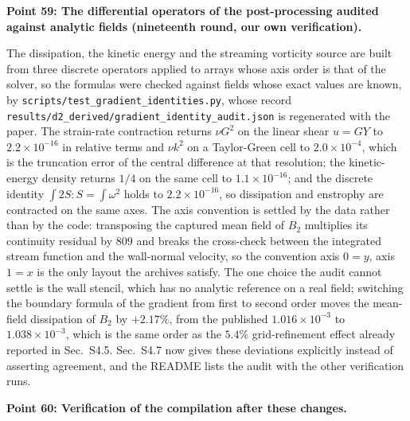 \documentclass[11pt,a4paper]{article}
\newcommand{\brk}{\hspace{0pt}}
\begin{document}
\vspace{1em}

\noindent\textbf{Point 59: The differential operators of the post-processing
audited against analytic fields (nineteenth round, our own verification).}

The dissipation, the kinetic energy and the streaming vorticity source are built
from three discrete operators applied to arrays whose axis order is that of the
solver, so the formulas were checked against fields whose exact values are known,
by \texttt{scripts/test\_gradient\_identities\brk.py}, whose record
\texttt{results/d2\_derived/gradient\_identity\_audit.json} is regenerated with
the paper. The strain-rate contraction returns \(\nu G^2\) on the linear shear
\(u=GY\) to \(2.2\times10^{-16}\) in relative terms and \(\nu k^2\) on a
Taylor-Green cell to \(2.0\times10^{-4}\), which is the truncation error of the
central difference at that resolution; the kinetic-energy density returns \(1/4\)
on the same cell to \(1.1\times10^{-16}\); and the discrete identity
\(\int2S:S=\int\omega^2\) holds to \(2.2\times10^{-16}\), so dissipation and
enstrophy are contracted on the same axes. The axis convention is settled by the
data rather than by the code: transposing the captured mean field of \(B_2\)
multiplies its continuity residual by \(809\) and breaks the cross-check between
the integrated stream function and the wall-normal velocity, so the convention
axis \(0=y\), axis \(1=x\) is the only layout the archives satisfy. The one
choice the audit cannot settle is the wall stencil, which has no analytic
reference on a real field; switching the boundary formula of the gradient from
first to second order moves the mean-field dissipation of \(B_2\) by \(+2.17\%\),
from the published \(1.016\times10^{-3}\) to \(1.038\times10^{-3}\), which is the
same order as the \(5.4\%\) grid-refinement effect already reported in
Sec.~S4.5. Sec.~S4.7 now gives these deviations explicitly instead of asserting
agreement, and the README lists the audit with the other verification runs.

\vspace{1em}

\noindent\textbf{Point 60: Verification of the compilation after these changes.}
\end{document}
